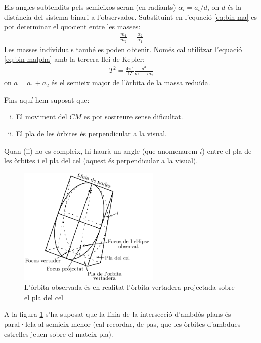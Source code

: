 Els angles subtendits pels semieixos seran (en radiants) $\alpha_{i} = a_{i} / d$, on $d$ és la distància del sistema binari a l'observador. Substituint en l'equació \eqref{eq:bin-ma} es pot determinar el quocient entre les masses:
\begin{align}\label{eq:bin-malpha}
	\frac{m_{1}}{m_{2}} = \frac{\alpha_{2}}{\alpha_{1}}
\end{align}
Les masses individuals també es poden obtenir. Només cal utilitzar l'equació \eqref{eq:bin-malpha} amb la tercera llei de Kepler:
\begin{align}\label{eq:bin-mkepler}
	T^{2} = \frac{4\pi^{2}}{G} \frac{a^{3}}{m_{1} + m_{2}}
\end{align}
on $a = a_{1} + a_{2}$ és el semieix major de l'òrbita de la massa reduïda.

Fins aquí hem suposat que:
\begin{enumerate}[(i)]
	\item El moviment del $CM$ es pot sostreure sense dificultat.
	\item El pla de les òrbites és perpendicular a la visual.
\end{enumerate}
Quan (ii) no es compleix, hi haurà un angle (que anomenarem $i$) entre el pla de les òrbites i el pla del cel (aquest és perpendicular a la visual).
\begin{figure}[h]
	\centering
	\includegraphics[width=0.6\textwidth]{./images/5-bin-visual-pla}
	\caption{L'òrbita observada és en realitat l'òrbita vertadera projectada sobre el pla del cel}
	\label{fig:bin-visual-pla}
\end{figure}

A la figura \ref{fig:bin-visual-pla} s'ha suposat que la línia de la intersecció d'ambdós plans és paral·lela al semieix menor (cal recordar, de pas, que les òrbites d'ambdues estrelles jeuen sobre el mateix pla).

